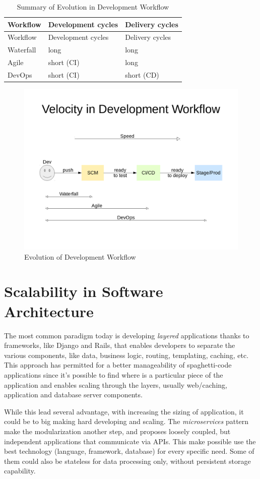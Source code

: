 \begin{longtable}[c]{@{}lll@{}}
\caption{Summary of Evolution in Development Workflow}\tabularnewline
\toprule
Workflow & Development cycles & Delivery cycles\tabularnewline
\midrule
\endfirsthead
\toprule
Workflow & Development cycles & Delivery cycles\tabularnewline
\midrule
\endhead
Waterfall & long & long\tabularnewline
Agile & short (CI) & long\tabularnewline
DevOps & short (CI) & short (CD)\tabularnewline
\bottomrule
\end{longtable}

\begin{figure}[htbp]
\centering
\includegraphics{media/ch2-devops.png}
\caption{Evolution of Development Workflow}
\end{figure}

\section{Scalability in Software
Architecture}\label{scalability-in-software-architecture}

The most common paradigm today is developing \textit{layered} applications
thanks to frameworks, like Django and Rails, that enables developers to
separate the various components, like data, business logic, routing,
templating, caching, etc. This approach has permitted for a better
manageability of spaghetti-code applications since it's possible to find
where is a particular piece of the application and enables scaling
through the layers, usually web/caching, application and database server
components.

While this lead several advantage, with increasing the sizing of
application, it could be to big making hard developing and scaling. The
\textit{microservices} pattern make the modularization another step, and
proposes loosely coupled, but independent applications that communicate
via APIs. This make possible use the best technology (language,
framework, database) for every specific need. Some of them could also be stateless for data processing only, without persistent storage capability.

